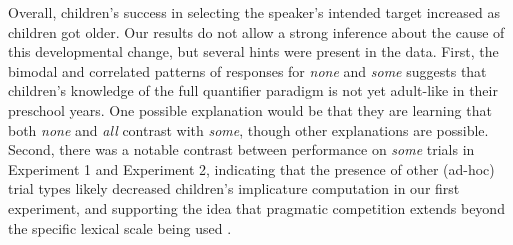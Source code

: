 \documentclass[10pt,letterpaper]{article}
\begin{document}



Overall, children's success in selecting the speaker's intended target increased as children got older. Our results do not allow a strong inference about the cause of this developmental change, but several hints were present in the data. First, the bimodal and correlated patterns of responses for \emph{none} and \emph{some} suggests that children's knowledge of the full quantifier paradigm is not yet adult-like in their preschool years. One possible explanation would be that they are learning that both \emph{none} and \emph{all} contrast with \emph{some}, though other explanations are possible. Second, there was a notable contrast between performance on \emph{some} trials in Experiment 1 and Experiment 2, indicating that the presence of other (ad-hoc) trial types likely decreased children's implicature computation in our first experiment, and supporting the idea that pragmatic competition extends beyond the specific lexical scale being used \cite{degen2014b}.

\end{document}

